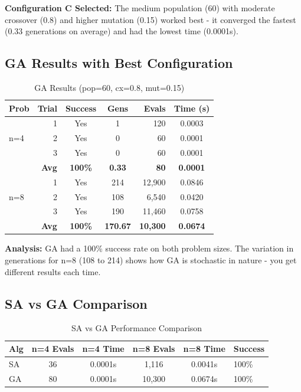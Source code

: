 \documentclass[letterpaper]{article}
\begin{document}
\textbf{Configuration C Selected:} The medium population (60) with moderate crossover (0.8) and higher mutation (0.15) worked best - it converged the fastest (0.33 generations on average) and had the lowest time (0.0001s).

\subsection{GA Results with Best Configuration}

\begin{table}[h]
\centering
\tiny
\begin{tabular}{lrccrc}
\toprule
\textbf{Prob} & \textbf{Trial} & \textbf{Success} & \textbf{Gens} & \textbf{Evals} & \textbf{Time (s)} \\
\midrule
\multirow{3}{*}{n=4} & 1 & Yes & 1 & 120 & 0.0003 \\
& 2 & Yes & 0 & 60 & 0.0001 \\
& 3 & Yes & 0 & 60 & 0.0001 \\
\cmidrule{2-6}
& \textbf{Avg} & \textbf{100\%} & \textbf{0.33} & \textbf{80} & \textbf{0.0001} \\
\midrule
\multirow{3}{*}{n=8} & 1 & Yes & 214 & 12,900 & 0.0846 \\
& 2 & Yes & 108 & 6,540 & 0.0420 \\
& 3 & Yes & 190 & 11,460 & 0.0758 \\
\cmidrule{2-6}
& \textbf{Avg} & \textbf{100\%} & \textbf{170.67} & \textbf{10,300} & \textbf{0.0674} \\
\bottomrule
\end{tabular}
\caption{GA Results (pop=60, cx=0.8, mut=0.15)}
\end{table}

\textbf{Analysis:} GA had a 100\% success rate on both problem sizes. The variation in generations for n=8 (108 to 214) shows how GA is stochastic in nature - you get different results each time.

\subsection{SA vs GA Comparison}

\begin{table}[h]
\centering
\tiny
\begin{tabular}{lccccl}
\toprule
\textbf{Alg} & \textbf{n=4 Evals} & \textbf{n=4 Time} & \textbf{n=8 Evals} & \textbf{n=8 Time} & \textbf{Success} \\
\midrule
SA & 36 & 0.0001s & 1,116 & 0.0041s & 100\% \\
GA & 80 & 0.0001s & 10,300 & 0.0674s & 100\% \\
\bottomrule
\end{tabular}
\caption{SA vs GA Performance Comparison}
\end{table}
\end{document}
